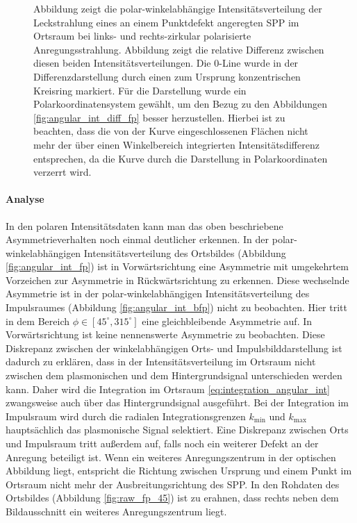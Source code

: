 \documentclass[titlepage,  ngerman]{article}
\begin{document}
\begin{figure}
			\caption{Abbildung  zeigt die polar-winkelabhängige Intensitätsverteilung der Leckstrahlung eines an einem Punktdefekt angeregten SPP im Ortsraum bei links- und rechts-zirkular polarisierte Anregungsstrahlung. Abbildung  zeigt die relative Differenz zwischen diesen beiden Intensitätsverteilungen. Die $0$-Line wurde in der Differenzdarstellung durch einen zum Ursprung konzentrischen Kreisring markiert. Für die Darstellung wurde ein Polarkoordinatensystem gewählt, um den Bezug zu den Abbildungen \ref{fig:angular_int_diff_fp} besser herzustellen. Hierbei ist zu beachten, dass die von der Kurve eingeschlossenen Flächen nicht mehr der über einen Winkelbereich integrierten Intensitätsdifferenz entsprechen, da die Kurve durch die Darstellung in Polarkoordinaten verzerrt wird.}
			\label{fig:angular_dist_bfp}
		\end{figure}
		\paragraph{Analyse}
		In den polaren Intensitätsdaten kann man das oben beschriebene Asymmetrieverhalten noch einmal deutlicher erkennen. In der polar-winkelabhängigen Intensitätsverteilung des Ortsbildes (Abbildung \ref{fig:angular_int_fp}) ist in Vorwärtsrichtung eine Asymmetrie mit umgekehrtem Vorzeichen zur Asymmetrie in Rückwärtsrichtung zu erkennen. Diese wechselnde Asymmetrie ist in der polar-winkelabhängigen Intensitätsverteilung des Impulsraumes (Abbildung \ref{fig:angular_int_bfp}) nicht zu beobachten. Hier tritt in dem Bereich $\phi \in [45^\circ, 315^\circ]$ eine gleichbleibende Asymmetrie auf. In Vorwärtsrichtung ist keine nennenswerte Asymmetrie zu beobachten. Diese Diskrepanz zwischen der winkelabhängigen Orts- und Impulsbilddarstellung ist dadurch zu erklären, dass in der Intensitätsverteilung im Ortsraum nicht zwischen dem plasmonischen und dem Hintergrundsignal unterschieden werden kann. Daher wird die Integration im Ortsraum \eqref{eq:integration_angular_int} zwangsweise auch über das Hintergrundsignal ausgeführt. Bei der Integration im Impulsraum wird durch die radialen Integrationsgrenzen $k_\mathrm{min}$ und $k_\mathrm{max}$ hauptsächlich das plasmonische Signal selektiert. Eine Diskrepanz zwischen Orts und Impulsraum tritt außerdem auf, falls noch ein weiterer Defekt an der Anregung beteiligt ist. Wenn ein weiteres Anregungszentrum in der optischen Abbildung liegt, entspricht die Richtung zwischen Ursprung und einem Punkt im Ortsraum nicht mehr der Ausbreitungsrichtung des SPP. In den Rohdaten des Ortsbildes (Abbildung \ref{fig:raw_fp_45}) ist zu erahnen, dass rechts neben dem Bildausschnitt ein weiteres Anregungszentrum liegt.	
	\FloatBarrier
\end{document}
